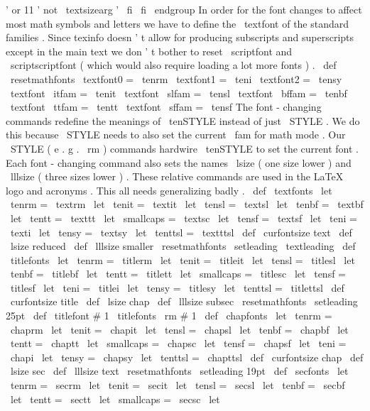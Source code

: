 {{{'
or
11
'
not
\
textsizearg
'
}
\
fi
\
fi
\
endgroup
}
%
In
order
for
the
font
changes
to
affect
most
math
symbols
and
letters
%
we
have
to
define
the
\
textfont
of
the
standard
families
.
Since
%
texinfo
doesn
'
t
allow
for
producing
subscripts
and
superscripts
except
%
in
the
main
text
we
don
'
t
bother
to
reset
\
scriptfont
and
%
\
scriptscriptfont
(
which
would
also
require
loading
a
lot
more
fonts
)
.
%
\
def
\
resetmathfonts
{
%
\
textfont0
=
\
tenrm
\
textfont1
=
\
teni
\
textfont2
=
\
tensy
\
textfont
\
itfam
=
\
tenit
\
textfont
\
slfam
=
\
tensl
\
textfont
\
bffam
=
\
tenbf
\
textfont
\
ttfam
=
\
tentt
\
textfont
\
sffam
=
\
tensf
}
%
The
font
-
changing
commands
redefine
the
meanings
of
\
tenSTYLE
instead
%
of
just
\
STYLE
.
We
do
this
because
\
STYLE
needs
to
also
set
the
%
current
\
fam
for
math
mode
.
Our
\
STYLE
(
e
.
g
.
\
rm
)
commands
hardwire
%
\
tenSTYLE
to
set
the
current
font
.
%
%
Each
font
-
changing
command
also
sets
the
names
\
lsize
(
one
size
lower
)
%
and
\
lllsize
(
three
sizes
lower
)
.
These
relative
commands
are
used
in
%
the
LaTeX
logo
and
acronyms
.
%
%
This
all
needs
generalizing
badly
.
%
\
def
\
textfonts
{
%
\
let
\
tenrm
=
\
textrm
\
let
\
tenit
=
\
textit
\
let
\
tensl
=
\
textsl
\
let
\
tenbf
=
\
textbf
\
let
\
tentt
=
\
texttt
\
let
\
smallcaps
=
\
textsc
\
let
\
tensf
=
\
textsf
\
let
\
teni
=
\
texti
\
let
\
tensy
=
\
textsy
\
let
\
tenttsl
=
\
textttsl
\
def
\
curfontsize
{
text
}
%
\
def
\
lsize
{
reduced
}
\
def
\
lllsize
{
smaller
}
%
\
resetmathfonts
\
setleading
{
\
textleading
}
}
\
def
\
titlefonts
{
%
\
let
\
tenrm
=
\
titlerm
\
let
\
tenit
=
\
titleit
\
let
\
tensl
=
\
titlesl
\
let
\
tenbf
=
\
titlebf
\
let
\
tentt
=
\
titlett
\
let
\
smallcaps
=
\
titlesc
\
let
\
tensf
=
\
titlesf
\
let
\
teni
=
\
titlei
\
let
\
tensy
=
\
titlesy
\
let
\
tenttsl
=
\
titlettsl
\
def
\
curfontsize
{
title
}
%
\
def
\
lsize
{
chap
}
\
def
\
lllsize
{
subsec
}
%
\
resetmathfonts
\
setleading
{
25pt
}
}
\
def
\
titlefont
#
1
{
{
\
titlefonts
\
rm
#
1
}
}
\
def
\
chapfonts
{
%
\
let
\
tenrm
=
\
chaprm
\
let
\
tenit
=
\
chapit
\
let
\
tensl
=
\
chapsl
\
let
\
tenbf
=
\
chapbf
\
let
\
tentt
=
\
chaptt
\
let
\
smallcaps
=
\
chapsc
\
let
\
tensf
=
\
chapsf
\
let
\
teni
=
\
chapi
\
let
\
tensy
=
\
chapsy
\
let
\
tenttsl
=
\
chapttsl
\
def
\
curfontsize
{
chap
}
%
\
def
\
lsize
{
sec
}
\
def
\
lllsize
{
text
}
%
\
resetmathfonts
\
setleading
{
19pt
}
}
\
def
\
secfonts
{
%
\
let
\
tenrm
=
\
secrm
\
let
\
tenit
=
\
secit
\
let
\
tensl
=
\
secsl
\
let
\
tenbf
=
\
secbf
\
let
\
tentt
=
\
sectt
\
let
\
smallcaps
=
\
secsc
\
let
\
}}
